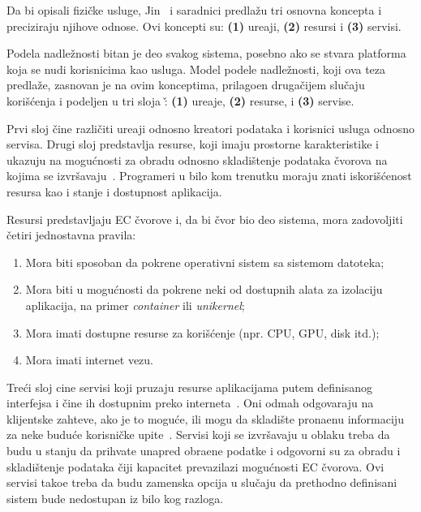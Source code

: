 Da bi opisali fizi\v cke usluge, Jin~\cite {JinCJL14} i saradnici predla\v zu tri osnovna koncepta i preciziraju njihove odnose. Ovi koncepti su: \textbf{(1)} ure\dj aji, \textbf{(2)} resursi i \textbf{(3)} servisi. 

Podela nadle\v znosti bitan je deo svakog sistema, posebno ako se stvara platforma koja se nudi korisnicima kao usluga. Model podele nadle\v znosti, koji ova teza predla\v ze, zasnovan je na ovim konceptima, prilago\dj en druga\v cijem slu\v caju kori\v s\'cenja i  podeljen u tri sloja \v: \textbf{(1)} ure\dj aje, \textbf{(2)} resurse, i \textbf{(3)} servise.

Prvi sloj \v cine razli\v citi ure\dj aji odnosno kreatori podataka i korisnici usluga odnosno servisa. Drugi sloj predstavlja resurse, koji imaju prostorne karakteristike i ukazuju na mogu\'cnosti za obradu odnosno skladi\v stenje podataka \v cvorova na kojima se izvr\v savaju~\cite{JinCJL14}. Programeri u bilo kom trenutku moraju znati iskori\v s\'cenost resursa kao i stanje i dostupnost aplikacija. 

Resursi predstavljaju EC \v cvorove i, da bi \v cvor bio deo sistema, mora zadovoljiti \v cetiri jednostavna pravila: 

\begin{enumerate}[start=1,label={(\bfseries \arabic*)}]
\item Mora biti sposoban da pokrene operativni sistem sa sistemom datoteka;
\item Mora biti u mogu\'cnosti da pokrene neki od dostupnih alata za izolaciju aplikacija, na primer \textit{container} ili \textit{unikernel}; 
\item Mora imati dostupne resurse za kori\v s\'cenje (npr. CPU, GPU, disk itd.);
\item Mora imati internet vezu.
\end{enumerate}

Tre\'ci sloj cine servisi koji pruzaju resurse aplikacijama putem definisanog interfejsa i \v cine ih dostupnim preko interneta~\cite {JinCJL14}. Oni odmah odgovaraju na klijentske zahteve, ako je to mogu\'ce, ili mogu da skladi\v ste prona\dj enu informaciju za neke budu\'ce korisni\v cke upite~\cite {SatyanarayananBCD09, YaoXWYZP20}. Servisi koji se izvr\v savaju u oblaku treba da budu u stanju da prihvate unapred obra\dj ene podatke i odgovorni su za obradu i skladi\v stenje podataka \v ciji kapacitet prevazilazi mogu\'cnosti EC \v cvorova. Ovi servisi tako\dj e treba da budu zamenska opcija u slu\v caju da prethodno definisani sistem bude nedostupan iz bilo kog razloga.

